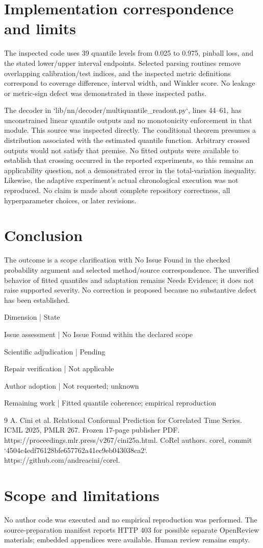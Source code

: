 \documentclass[10pt]{article}
\begin{document}
\section*{Implementation correspondence and limits}
The inspected code uses 39 quantile levels from 0.025 to 0.975, pinball loss, and the stated lower/upper interval endpoints. Selected parsing routines remove overlapping calibration/test indices, and the inspected metric definitions correspond to coverage difference, interval width, and Winkler score. No leakage or metric-sign defect was demonstrated in these inspected paths.\par
The decoder in `lib/nn/decoder/multiquantile\_readout.py`, lines 44–61, has unconstrained linear quantile outputs and no monotonicity enforcement in that module. This source was inspected directly. The conditional theorem presumes a distribution associated with the estimated quantile function. Arbitrary crossed outputs would not satisfy that premise. No fitted outputs were available to establish that crossing occurred in the reported experiments, so this remains an applicability question, not a demonstrated error in the total-variation inequality. Likewise, the adaptive experiment’s actual chronological execution was not reproduced. No claim is made about complete repository correctness, all hyperparameter choices, or later revisions.\par
\section*{Conclusion}
The outcome is a scope clarification with No Issue Found in the checked probability argument and selected method/source correspondence. The unverified behavior of fitted quantiles and adaptation remains Needs Evidence; it does not raise supported severity. No correction is proposed because no substantive defect has been established.\par
Dimension | State\par
Issue assessment | No Issue Found within the declared scope\par
Scientific adjudication | Pending\par
Repair verification | Not applicable\par
Author adoption | Not requested; unknown\par
Remaining work | Fitted quantile coherence; empirical reproduction\par
9 A. Cini et al. Relational Conformal Prediction for Correlated Time Series. ICML 2025, PMLR 267. Frozen 17-page publisher PDF. https://proceedings.mlr.press/v267/cini25a.html. CoRel authors. corel, commit `4504c4edf76128bfe657762a41ec9eb043038ca2`. https://github.com/andreacini/corel.\par
\section*{Scope and limitations}
No author code was executed and no empirical reproduction was performed. The source-preparation manifest reports HTTP 403 for possible separate OpenReview materials; embedded appendices were available. Human review remains empty.\par
\end{document}

